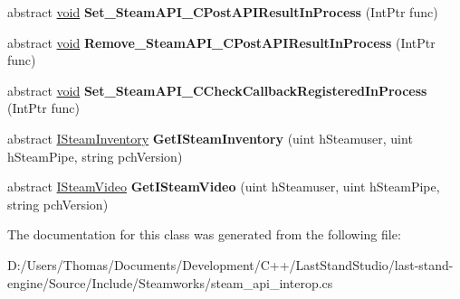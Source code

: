 \begin{DoxyCompactItemize}
\item 
\hypertarget{classValve_1_1Steamworks_1_1ISteamClient_ae68e94596796c2a0b0e2b0e85130562e}{}abstract \hyperlink{SDL__audio_8h_a52835ae37c4bb905b903cbaf5d04b05f}{void} {\bfseries Set\+\_\+\+Steam\+A\+P\+I\+\_\+\+C\+Post\+A\+P\+I\+Result\+In\+Process} (Int\+Ptr func)\label{classValve_1_1Steamworks_1_1ISteamClient_ae68e94596796c2a0b0e2b0e85130562e}

\item 
\hypertarget{classValve_1_1Steamworks_1_1ISteamClient_aed732a507680b884c6e4fb18df1f1a99}{}abstract \hyperlink{SDL__audio_8h_a52835ae37c4bb905b903cbaf5d04b05f}{void} {\bfseries Remove\+\_\+\+Steam\+A\+P\+I\+\_\+\+C\+Post\+A\+P\+I\+Result\+In\+Process} (Int\+Ptr func)\label{classValve_1_1Steamworks_1_1ISteamClient_aed732a507680b884c6e4fb18df1f1a99}

\item 
\hypertarget{classValve_1_1Steamworks_1_1ISteamClient_ac32282b017e9591db008aa1422d705b7}{}abstract \hyperlink{SDL__audio_8h_a52835ae37c4bb905b903cbaf5d04b05f}{void} {\bfseries Set\+\_\+\+Steam\+A\+P\+I\+\_\+\+C\+Check\+Callback\+Registered\+In\+Process} (Int\+Ptr func)\label{classValve_1_1Steamworks_1_1ISteamClient_ac32282b017e9591db008aa1422d705b7}

\item 
\hypertarget{classValve_1_1Steamworks_1_1ISteamClient_a98fa8b46394b021c680c29cef221b003}{}abstract \hyperlink{classValve_1_1Steamworks_1_1ISteamInventory}{I\+Steam\+Inventory} {\bfseries Get\+I\+Steam\+Inventory} (uint h\+Steamuser, uint h\+Steam\+Pipe, string pch\+Version)\label{classValve_1_1Steamworks_1_1ISteamClient_a98fa8b46394b021c680c29cef221b003}

\item 
\hypertarget{classValve_1_1Steamworks_1_1ISteamClient_aa8ff02cfbdc9cd94262196d1974bdf76}{}abstract \hyperlink{classValve_1_1Steamworks_1_1ISteamVideo}{I\+Steam\+Video} {\bfseries Get\+I\+Steam\+Video} (uint h\+Steamuser, uint h\+Steam\+Pipe, string pch\+Version)\label{classValve_1_1Steamworks_1_1ISteamClient_aa8ff02cfbdc9cd94262196d1974bdf76}

\end{DoxyCompactItemize}


The documentation for this class was generated from the following file\+:\begin{DoxyCompactItemize}
\item 
D\+:/\+Users/\+Thomas/\+Documents/\+Development/\+C++/\+Last\+Stand\+Studio/last-\/stand-\/engine/\+Source/\+Include/\+Steamworks/steam\+\_\+api\+\_\+interop.\+cs\end{DoxyCompactItemize}
